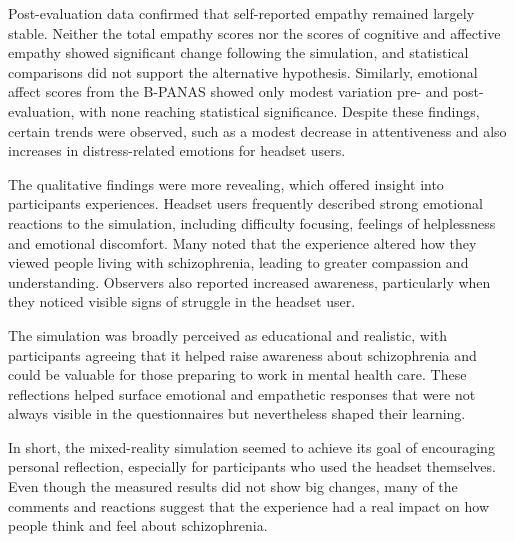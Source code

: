 \vspace{1em}

Post-evaluation data confirmed that self-reported empathy remained largely stable. Neither the total empathy scores nor the scores of cognitive and affective empathy showed significant change following the simulation, and statistical comparisons did not support the alternative hypothesis. Similarly, emotional affect scores from the B-PANAS showed only modest variation pre- and post-evaluation, with none reaching statistical significance. Despite these findings, certain trends were observed, such as a modest decrease in attentiveness and also increases in distress-related emotions for headset users.

\vspace{1em}

The qualitative findings were more revealing, which offered insight into participants experiences. Headset users frequently described strong emotional reactions to the simulation, including difficulty focusing, feelings of helplessness and emotional discomfort. Many noted that the experience altered how they viewed people living with schizophrenia, leading to greater compassion and understanding. Observers also reported increased awareness, particularly when they noticed visible signs of struggle in the headset user.

The simulation was broadly perceived as educational and realistic, with participants agreeing that it helped raise awareness about schizophrenia and could be valuable for those preparing to work in mental health care. These reflections helped surface emotional and empathetic responses that were not always visible in the questionnaires but nevertheless shaped their learning.

\vspace{1em}

In short, the mixed-reality simulation seemed to achieve its goal of encouraging personal reflection, especially for participants who used the headset themselves. Even though the measured results did not show big changes, many of the comments and reactions suggest that the experience had a real impact on how people think and feel about schizophrenia.